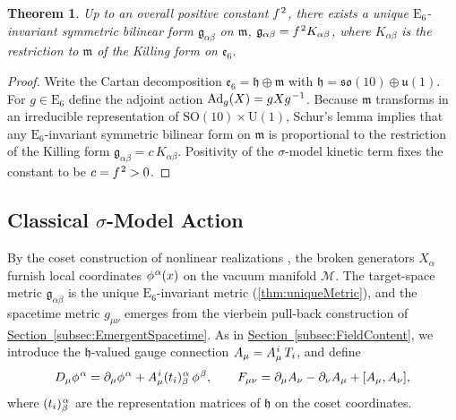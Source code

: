 \documentclass[pdflatex,sn-mathphys-num]{sn-jnl}
\theoremstyle{thmstyleone}
\newtheorem{theorem}{Theorem}
\theoremstyle{thmstyletwo}%
\theoremstyle{thmstylethree}%
\newcommand{\SO}[1]{\mathrm{SO(#1)}}
\newcommand{\U}[1]{\mathrm{U(#1)}}
\newcommand{\E}[1]{\mathrm{E_{#1}}}
\newcommand{\M}{\mathcal{M}}
\newcommand{\SOTen}{\SO{10}}
\newcommand{\UOne}{\U{1}}
\newcommand{\ESix}{\E{6}}
\newcommand{\SOTenXUOne}{\SOTen \times \UOne}
\newcommand{\sm}{\hspace{.065em}}
\newcommand{\subsecref}[1]{\hyperref[#1]{Section~\ref*{#1}}}
\newcommand{\smexp}[1]{^{\sm #1}}
\begin{document}
\begin{theorem}\label{thm:uniqueMetric}
Up to an overall positive constant $f\smexp{2}$, there exists a unique
$\ESix$-invariant symmetric bilinear form $\mathfrak g_{\alpha\beta}$ on
$\mathfrak m$, $\mathfrak g_{\alpha\beta} = f\smexp{2} K_{\alpha\beta}$,
where $K_{\alpha\beta}$ is the restriction to $\mathfrak m$ of the Killing form
on $\mathfrak e_{6}$.
\end{theorem}

\begin{proof}
Write the Cartan decomposition $\mathfrak e_{6}=\mathfrak h\oplus\mathfrak m$
with $\mathfrak h=\mathfrak{so}(10)\oplus\mathfrak u(1)$.  For $g\in \ESix$ define the adjoint action $\operatorname{Ad}_{g}(X)=gXg\smexp{-1}$. Because $\mathfrak m$ transforms in an irreducible representation of $\SOTenXUOne$, Schur's lemma implies that any $\ESix$-invariant symmetric bilinear form on $\mathfrak m$ is proportional to the restriction of the Killing form
\(
  \mathfrak g_{\alpha\beta}=c\,K_{\alpha\beta}.
\)
Positivity of the $\sigma$-model kinetic term fixes the constant to be $c=f\smexp{2}>0$.
\end{proof}

\subsection{Classical \texorpdfstring{$\sigma$}{Sigma}-Model Action}
\label{subsec:action}

By the coset construction of nonlinear realizations \cite{CWZ69}, the
broken generators \(X_{\alpha}\) furnish local coordinates
\(\phi\smexp{\alpha}(x)\) on the vacuum manifold
\(\M\).  The target-space metric
\(\mathfrak g_{\alpha\beta}\) is the unique \(\ESix\)-invariant metric
(\autoref{thm:uniqueMetric}), and the spacetime metric \(g_{\mu\nu}\)
emerges from the vierbein pull-back construction of
\subsecref{subsec:EmergentSpacetime}.  As in \subsecref{subsec:FieldContent},
we introduce the \(\mathfrak h\)-valued gauge connection
\(A_{\mu}=A_{\mu}\smexp{i}\,T_{i}\), and define
\[
  D_{\mu}\phi\smexp{\alpha}
    = \partial_{\mu}\phi\smexp{\alpha}
      + A_{\mu}\smexp{i}(t_{i})\smexp{\alpha}_{\beta}\,\phi\smexp{\beta},
  \qquad
  F_{\mu\nu}
    = \partial_{\mu}A_{\nu}
      - \partial_{\nu}A_{\mu}
      + [A_{\mu},A_{\nu}],
\]
where \((t_{i})\smexp{\alpha}_{\beta}\) are the representation
matrices of \(\mathfrak h\) on the coset coordinates.
\end{document}
